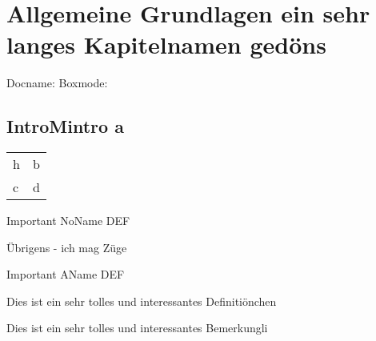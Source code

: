 \documentclass[Typ=Mitschrieb,Vorlesung=LAII]{Lilly}
\begin{document}
  
    \chapter{Allgemeine Grundlagen ein sehr langes Kapitelnamen gedöns} 
    Docname: \LILLYxDOCUMENTNAME\newline
    Boxmode: \LILLYxBOXxMODE
    
\section{IntroMintro a}
        \begin{tabularx}{\linewidth}{lX}
            h & b \\
            c & d
        \end{tabularx}

        \begin{definition*}
            Important NoName DEF
        \end{definition*}

        \begin{satz}[Übrigens]
            Übrigens - ich mag Züge
        \end{satz}

        \begin{definition*}[Important]
            Important AName DEF
        \end{definition*}

        \begin{definition}
            Dies ist ein sehr tolles und interessantes Definitiönchen
        \end{definition}
        \begin{bemerkung}
            Dies ist ein sehr tolles und interessantes Bemerkungli
        \end{bemerkung}

\end{document}
